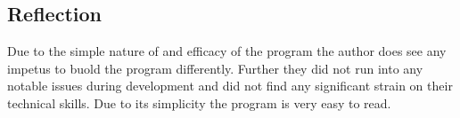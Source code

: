 \documentclass[11pt]{article}
\begin{document}
\subsection{Reflection}
Due to the simple nature of and efficacy of the program the author does see any impetus to buold the program differently. Further they did not run into any notable issues during development and did not find any significant strain on their technical skills. Due to its simplicity the program is very easy to read.


\end{document}
